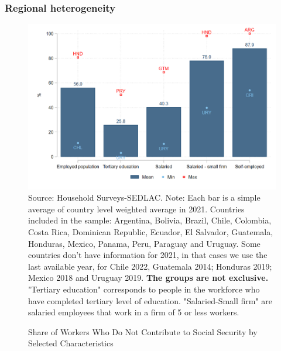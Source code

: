 \documentclass{beamer}
\begin{document}
\begin{frame}
\frametitle{Regional heterogeneity}
\begin{figure}[!htb]
        \justifying
        \caption{Share of Workers Who Do Not Contribute to Social Security by Selected Characteristics}     
        \includegraphics[scale=.2]{latex/figures/Snapshot/Social security contributions.png}
        \label{fig:SScontributions}
        \footnotesize{Source: Household Surveys-SEDLAC.}
        \footnotesize{Note: Each bar is a simple average of country level weighted average in 2021. Countries included in the sample: Argentina, Bolivia, Brazil, Chile, Colombia, Costa Rica, Dominican Republic, Ecuador, El Salvador, Guatemala, Honduras, Mexico, Panama, Peru, Paraguay and Uruguay. Some countries don’t have information for 2021, in that cases we use the last available year, for Chile 2022, Guatemala 2014; Honduras 2019; Mexico 2018 and Uruguay 2019. \textbf{The groups are not exclusive.} "Tertiary education" corresponds to people in the workforce who have completed tertiary level of education. "Salaried-Small firm" are salaried employees that work in a firm of 5 or less workers.}
 \end{figure}
 \end{frame}
\end{document}
